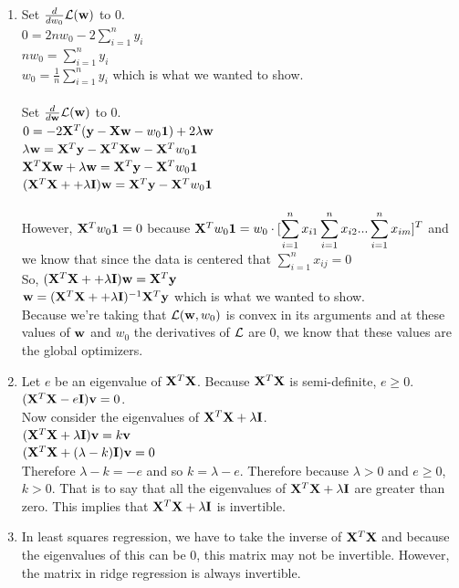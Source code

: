 \documentclass[submit]{harvardml}
\begin{document}
\begin{enumerate}
		 \item  Set $\frac{d}{dw_0}\mathcal{L}(\mathbf{w})$ to 0.  \\
		 $0 = 2nw_0 -2\displaystyle\sum_{i=1}^{n}y_i $ \\
		 $nw_0 = \displaystyle\sum_{i=1}^{n}y_i$ \\
		 $w_0 = \frac{1}{n}\displaystyle\sum_{i=1}^{n}y_i$ which is what we wanted to show.\\
		 \\  
		 Set $\frac{d}{d\mathbf{w}}\mathcal{L}(\mathbf{w})$ to 0. \\
		 $0 = -2\mathbf{X}^T(\mathbf{y}-\mathbf{X}\mathbf{w}-w_0\textbf{1})  + 2\lambda\mathbf{w}$ \\
		 $\lambda\mathbf{w} = \mathbf{X}^T\mathbf{y}-\mathbf{X}^T\mathbf{X}\mathbf{w}-\mathbf{X}^Tw_0\textbf{1}$ \\
		 $\mathbf{X}^T\mathbf{X}\mathbf{w} + \lambda\mathbf{w} = \mathbf{X}^T\mathbf{y}-\mathbf{X}^Tw_0\textbf{1}$ \\
		 $(\mathbf{X}^T\mathbf{X} + + \lambda\mathbf{I})\mathbf{w} = \mathbf{X}^T\mathbf{y} -\mathbf{X}^Tw_0\textbf{1}$ \\
		 \\
		 However, $\mathbf{X}^Tw_0\textbf{1} = 0$ because $\mathbf{X}^Tw_0\textbf{1} = w_0 \cdot [\displaystyle\sum_{i = 1}^{n}x_{i1}  \displaystyle\sum_{i = 1}^{n}x_{i2} ... \displaystyle\sum_{i = 1}^{n}x_{im}]^T$ and we know that since the data is centered that $\displaystyle\sum_{i=1}^{n}x_{ij} = 0$ \\
		 So, $(\mathbf{X}^T\mathbf{X} + + \lambda\mathbf{I})\mathbf{w} = \mathbf{X}^T\mathbf{y}$ \\
		 $\mathbf{w} = (\mathbf{X}^T\mathbf{X} + + \lambda\mathbf{I})^{-1}\mathbf{X}^T\mathbf{y}$ which is what we wanted to show.  
		 \\
		 Because we're taking that $\mathcal{L}(\mathbf{w},w_0)$ is convex in its arguments and at these values of $\mathbf{w}$ and $w_0$ the derivatives of $\mathcal{L}$ are 0, we know that these values are the global optimizers. 
		 
		 \item Let $e$ be an eigenvalue of $\mathbf{X}^T\mathbf{X}$.  Because $\mathbf{X}^T\mathbf{X}$ is semi-definite, $e\geq 0$.  $(\mathbf{X}^T\mathbf{X} - e\mathbf{I})\mathbf{v} = 0$.  \\
		 Now consider the eigenvalues of $\mathbf{X}^T\mathbf{X} + \lambda\mathbf{I}$.  \\
		 $(\mathbf{X}^T\mathbf{X} + \lambda\mathbf{I})\mathbf{v} = k\mathbf{v}$ \\
		 $(\mathbf{X}^T\mathbf{X} + (\lambda - k)\mathbf{I})\mathbf{v} = 0$ \\
		 Therefore $\lambda - k = -e$ and so $k = \lambda - e$.  Therefore because $\lambda > 0$ and $e \geq 0$, $k > 0$.  That is to say that all the eigenvalues of $\mathbf{X}^T\mathbf{X} + \lambda\mathbf{I}$ are greater than zero.  This implies that $\mathbf{X}^T\mathbf{X} + \lambda\mathbf{I}$ is invertible.  
		 
		 \item In least squares regression, we have to take the inverse of $\mathbf{X}^T\mathbf{X}$ and because the eigenvalues of this can be 0, this matrix may not be invertible.  However, the matrix in ridge regression is always invertible.  
		 
		 
	\end{enumerate}
	
\end{document}
